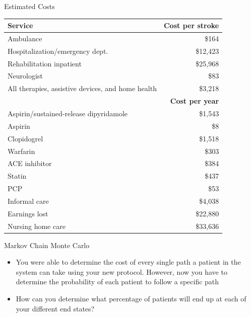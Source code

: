 \documentclass[10pt, xcolor=table]{beamer}
\begin{document}
\begin{frame}{Estimated Costs}
	\begin{center}
		\scriptsize
		\begin{tabular}{lr}
			\toprule
    	\textbf{Service} &  \textbf{Cost per stroke} \\
			\midrule
    	Ambulance &  \$164 \\
    	Hospitalization/emergency dept. & \$12,423 \\
			Rehabilitation inpatient & \$25,968 \\
			Neurologist & \$83 \\
			All therapies, assistive devices, and home health & \$3,218 \\               
			\midrule
			& \textbf{Cost per year} \\
			\midrule
			Aspirin/sustained-release dipyridamole & \$1,543 \\
			Aspirin & \$8 \\
			Clopidogrel & \$1,518 \\
			Warfarin & \$303 \\
			ACE inhibitor & \$384 \\
			Statin & \$437 \\
			PCP & \$53 \\
			Informal care & \$4,038 \\
			Earnings lost & \$22,880 \\
			Nursing home care & \$33,636 \\
			\bottomrule
		\end{tabular}
	\end{center}
\end{frame}

\begin{frame}{Markov Chain Monte Carlo}
	\begin{itemize}
		\item You were able to determine the cost of every single path a patient in the system can take using your new protocol. However, now you have to determine the probability of each patient to follow a specific path
		\item How can you determine what percentage of patients will end up at each of your different end states?
	\end{itemize}
\end{frame}

\end{document}
